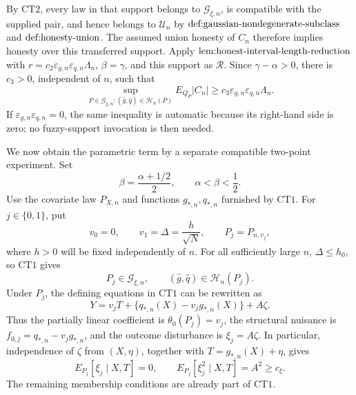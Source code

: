 By \(\mathrm{CT2}\), every law in that support belongs to \(\mathcal G_{\xi,n}\), is compatible with the supplied pair, and hence belongs to \(\mathcal U_n\) by \(\textup{def:gaussian-nondegenerate-subclass}\) and \(\textup{def:honesty-union}\).  The assumed union honesty of \(C_n\) therefore implies honesty over this transferred support.  Apply \(\textup{lem:honest-interval-length-reduction}\) with \(r=c_2\varepsilon_{g,n}\varepsilon_{q,n}\Lambda_n\), \(\beta=\gamma\), and this support as \(\mathscr R\).  Since \(\gamma-\alpha>0\), there is \(c_3>0\), independent of \(n\), such that
\[
 \sup_{P\in\mathcal G_{\xi,n}:(\widehat g,\widehat q)\in\mathcal H_n(P)}
 E_{Q_P}|C_n|
 \ge c_3\varepsilon_{g,n}\varepsilon_{q,n}\Lambda_n.
\]
If \(\varepsilon_{g,n}\varepsilon_{q,n}=0\), the same inequality is automatic because its right-hand side is zero; no fuzzy-support invocation is then needed.

We now obtain the parametric term by a separate compatible two-point experiment.  Set
\[
 \beta=\frac{\alpha+1/2}{2},
 \qquad \alpha<\beta<\frac12.
\]
Use the covariate law \(P_{X,n}\) and functions \(g_{*,n},q_{*,n}\) furnished by \(\mathrm{CT1}\).  For \(j\in\{0,1\}\), put
\[
 v_0=0,
 \qquad
 v_1=\Delta=\frac{h}{\sqrt N},
 \qquad
 P_j=P_{n,v_j},
\]
where \(h>0\) will be fixed independently of \(n\).  For all sufficiently large \(n\), \(\Delta\le h_0\), so \(\mathrm{CT1}\) gives
\[
 P_j\in\mathcal G_{\xi,n},
 \qquad
 (\widehat g,\widehat q)\in\mathcal H_n(P_j).
\]
Under \(P_j\), the defining equations in \(\mathrm{CT1}\) can be rewritten as
\[
 Y=v_jT+\{q_{*,n}(X)-v_jg_{*,n}(X)\}+A\zeta.
\]
Thus the partially linear coefficient is \(\theta_0(P_j)=v_j\), the structural nuisance is \(f_{0,j}=q_{*,n}-v_jg_{*,n}\), and the outcome disturbance is \(\xi_j=A\zeta\).  In particular, independence of \(\zeta\) from \((X,\eta)\), together with \(T=g_{*,n}(X)+\eta\), gives
\[
 E_{P_j}[\xi_j\mid X,T]=0,
 \qquad
 E_{P_j}[\xi_j^2\mid X,T]=A^2\ge c_\xi.
\]
The remaining membership conditions are already part of \(\mathrm{CT1}\).

